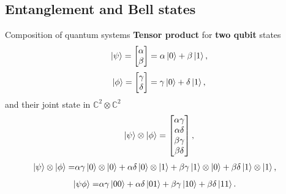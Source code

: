         \subsection{Entanglement and Bell states}
        \begin{frame}{Composition of quantum systems}
            \textbf{Tensor product} for \textbf{two qubit} states 
            \begin{equation}\nonumber
                \ket{\psi}=\begin{bmatrix}
                    \alpha\\
                    \beta
                \end{bmatrix}=\alpha\ket{0}+\beta\ket{1},
            \end{equation}
            \begin{equation*}
                \ket{\phi}=\begin{bmatrix}
                    \gamma\\
                    \delta
                \end{bmatrix}=\gamma\ket{0}+\delta\ket{1},
            \end{equation*}
            and their joint state in $\mathbb{C}^2\otimes\mathbb{C}^2$ 
            \begin{equation*}
                \begin{split}
                    \ket{\psi}\otimes\ket{\phi}=
                    \begin{bmatrix}
                        \alpha \gamma\\
                        \alpha \delta\\
                        \beta \gamma\\
                        \beta \delta
                    \end{bmatrix},
                \end{split}
            \end{equation*}
            \begin{equation*}
                \begin{split}
                    \ket{\psi}\otimes\ket{\phi} =
                    & \alpha \gamma \ket{0}\otimes\ket{0}  
                    + \alpha \delta \ket{0}\otimes\ket{1} 
                    + \beta \gamma \ket{1}\otimes\ket{0}  
                    + \beta \delta \ket{1}\otimes\ket{1},
                \end{split}
            \end{equation*}
            \begin{equation*}
                \begin{split}
                    \ket{\psi\phi}=
                    & \alpha \gamma \ket{00}  
                    + \alpha \delta \ket{01} 
                    + \beta \gamma \ket{10}  
                    + \beta \delta \ket{11}.
                \end{split}
            \end{equation*}
        \end{frame}
